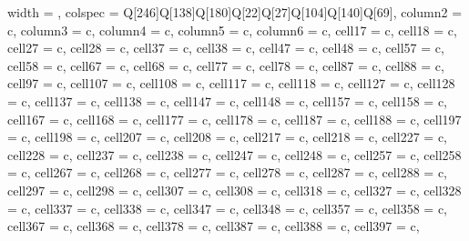 {
\small
\begin{longtblr}[
    theme = shortcaption,
    entry = {Inoculation tests on different grapevine varieties},
    caption = {\textbf{Summary of the inoculation tests on grapevine varieties
                ranked from most to less susceptible in the disease index.}
            Thirty-six local,
            regional and international varieties were screened in combination
            with eight
            rootstocks. The number of symptomatic leaves was counted 16 weeks
            after
            inoculation and infections were confirmed by qPCR. DI: disease
            index; AUDCP:
            area under the disease progress curve.},
    label = {tableS1},
    ]{
    width = \linewidth,
    colspec = {Q[246]Q[138]Q[180]Q[22]Q[27]Q[104]Q[140]Q[69]},
    column{2} = {c},
    column{3} = {c},
    column{4} = {c},
    column{5} = {c},
    column{6} = {c},
    cell{1}{7} = {c},
    cell{1}{8} = {c},
    cell{2}{7} = {c},
    cell{2}{8} = {c},
    cell{3}{7} = {c},
    cell{3}{8} = {c},
    cell{4}{7} = {c},
    cell{4}{8} = {c},
    cell{5}{7} = {c},
    cell{5}{8} = {c},
    cell{6}{7} = {c},
    cell{6}{8} = {c},
    cell{7}{7} = {c},
    cell{7}{8} = {c},
    cell{8}{7} = {c},
    cell{8}{8} = {c},
    cell{9}{7} = {c},
    cell{10}{7} = {c},
    cell{10}{8} = {c},
    cell{11}{7} = {c},
    cell{11}{8} = {c},
    cell{12}{7} = {c},
    cell{12}{8} = {c},
    cell{13}{7} = {c},
    cell{13}{8} = {c},
    cell{14}{7} = {c},
    cell{14}{8} = {c},
    cell{15}{7} = {c},
    cell{15}{8} = {c},
    cell{16}{7} = {c},
    cell{16}{8} = {c},
    cell{17}{7} = {c},
    cell{17}{8} = {c},
    cell{18}{7} = {c},
    cell{18}{8} = {c},
    cell{19}{7} = {c},
    cell{19}{8} = {c},
    cell{20}{7} = {c},
    cell{20}{8} = {c},
    cell{21}{7} = {c},
    cell{21}{8} = {c},
    cell{22}{7} = {c},
    cell{22}{8} = {c},
    cell{23}{7} = {c},
    cell{23}{8} = {c},
    cell{24}{7} = {c},
    cell{24}{8} = {c},
    cell{25}{7} = {c},
    cell{25}{8} = {c},
    cell{26}{7} = {c},
    cell{26}{8} = {c},
    cell{27}{7} = {c},
    cell{27}{8} = {c},
    cell{28}{7} = {c},
    cell{28}{8} = {c},
    cell{29}{7} = {c},
    cell{29}{8} = {c},
    cell{30}{7} = {c},
    cell{30}{8} = {c},
    cell{31}{8} = {c},
    cell{32}{7} = {c},
    cell{32}{8} = {c},
    cell{33}{7} = {c},
    cell{33}{8} = {c},
    cell{34}{7} = {c},
    cell{34}{8} = {c},
    cell{35}{7} = {c},
    cell{35}{8} = {c},
    cell{36}{7} = {c},
    cell{36}{8} = {c},
    cell{37}{8} = {c},
    cell{38}{7} = {c},
    cell{38}{8} = {c},
    cell{39}{7} = {c},
}
\end{longtblr}}
